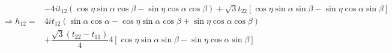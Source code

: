 \documentclass{article}
\begin{document}
\begin{align*}
	                     & - 4it_{12}(\cos\eta\sin\alpha\cos\beta - \sin\eta\cos\alpha\cos\beta) + \sqrt{3} t_{22}\left[ \cos\eta\sin\alpha\sin\beta - \sin\eta\cos\alpha\sin\beta \right]                                                                                                         \\
	\Rightarrow h_{12} = & 4it_{12}(\sin\alpha\cos\alpha - \cos\eta\sin\alpha\cos\beta + \sin\eta\cos\alpha\cos\beta )                                                                                                                                                                             \\
	                     & + \dfrac{\sqrt{3} (t_{22} - t_{11}) }{4}4\left[ \cos\eta\sin\alpha\sin\beta - \sin\eta\cos\alpha\sin\beta  \right]                                                                                                                                                      \\
\end{align*}
\end{document}
